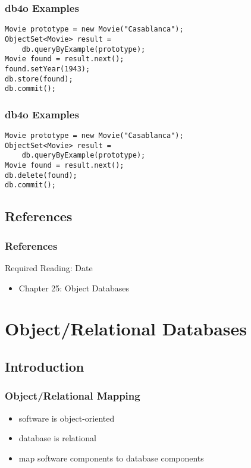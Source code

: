 \documentclass[dvipsnames]{beamer}
\theoremstyle{plain}
\begin{document}
\begin{frame}[fragile]
  \frametitle{db4o Examples}

  \begin{example}[update]
    \begin{lstlisting}
Movie prototype = new Movie("Casablanca");
ObjectSet<Movie> result =
    db.queryByExample(prototype);
Movie found = result.next();
found.setYear(1943);
db.store(found);
db.commit();
    \end{lstlisting}
  \end{example}
\end{frame}

\begin{frame}[fragile]
  \frametitle{db4o Examples}

  \begin{example}[delete]
    \begin{lstlisting}
Movie prototype = new Movie("Casablanca");
ObjectSet<Movie> result =
    db.queryByExample(prototype);
Movie found = result.next();
db.delete(found);
db.commit();
    \end{lstlisting}
  \end{example}
\end{frame}

\subsection*{References}

\begin{frame}
  \frametitle{References}

  \begin{block}{Required Reading: Date}
    \begin{itemize}
      \item Chapter 25: \alert{Object Databases}
    \end{itemize}
  \end{block}
\end{frame}

\section{Object/Relational Databases}

\subsection{Introduction}

\begin{frame}
  \frametitle{Object/Relational Mapping}

  \begin{itemize}
    \item software is object-oriented
    \item database is relational
    \item map software components to database components
  \end{itemize}
\end{frame}
\end{document}
